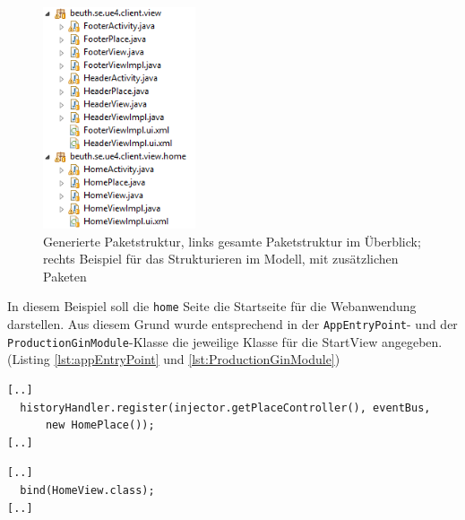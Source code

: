 \begin{figure}[htbp]
\begin{center}
\includegraphics[width=0.4\textwidth]{./img/PackagesExample.png}
\caption{Generierte Paketstruktur, links gesamte
Paketstruktur im Überblick; rechts Beispiel für das
Strukturieren im Modell, mit zusätzlichen Paketen}\label{Fig:packegeModel}
\end{center}
\end{figure}
 
In diesem Beispiel soll die \texttt{home} Seite die Startseite für die
Webanwendung darstellen. Aus diesem Grund wurde entsprechend in der
\texttt{AppEntryPoint}- und der \texttt{ProductionGinModule}-Klasse die
jeweilige Klasse für die StartView angegeben. (Listing \ref{lst:appEntryPoint}
und \ref{lst:ProductionGinModule}) 
\lstset{language=gwt}
\begin{lstlisting}[caption={Änderung an der AppEntryPoint-Klasse zur Bestimmung
der Startseite}, label={lst:appEntryPoint}] 
[..]
  historyHandler.register(injector.getPlaceController(), eventBus,
      new HomePlace());
[..]
\end{lstlisting}
\lstset{language=gwt}
\begin{lstlisting}[caption={Änderung an der ProductionGinModule-Klasse zur
Bestimmung der Startseite}, label={lst:ProductionGinModule}] 
[..]
  bind(HomeView.class);
[..]
\end{lstlisting}

